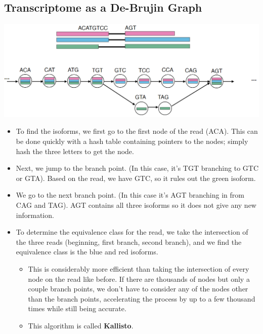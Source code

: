 \documentclass[10pt]{article}
\begin{document}
\subsection*{Transcriptome as a De-Brujin Graph}
\begin{center}
    \includegraphics*[scale=0.6]{W4_8.png}
\end{center}
\begin{itemize}
    \item To find the isoforms, we first go to the first node of the read (ACA).  This can be done quickly with a hash table containing pointers to the nodes; simply hash the three letters to get the node.  
    \item Next, we jump to the branch point.  (In this case, it's TGT branching to GTC or GTA).  Based on the read, we have GTC, so it rules out the green isoform.
    \item We go to the next branch point.  (In this case it's AGT branching in from CAG and TAG).  AGT contains all three isoforms so it does not give any new information.
    \item To determine the equivalence class for the read, we take the intersection of the three reads (beginning, first branch, second branch), and we find the equivalence class is the blue and red isoforms.
    \begin{itemize}
        \item This is considerably more efficient than taking the intersection of every node on the read like before.  If there are thousands of nodes but only a couple branch points, we don't have to consider any of the nodes other than the branch points, accelerating the process by up to a few thousand times while still being accurate.
        \item This algorithm is called \textbf{Kallisto}.
    \end{itemize}
\end{itemize}
\end{document}
